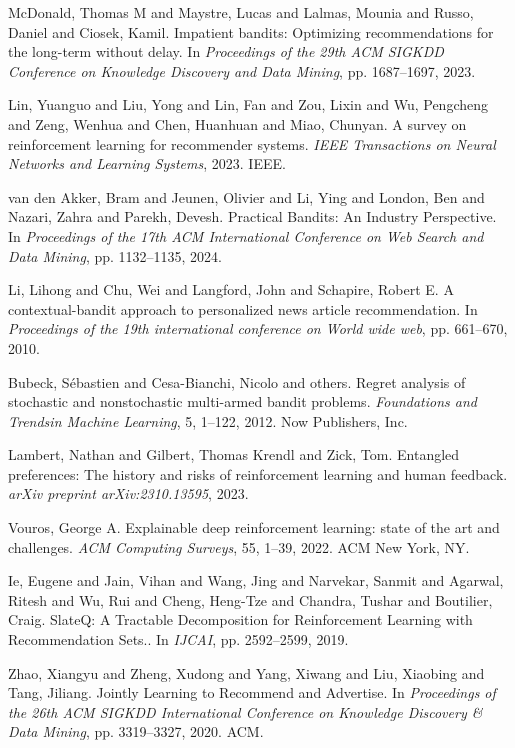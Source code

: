 \begin{thebibliography}{99}
 McDonald, Thomas M and Maystre, Lucas and Lalmas, Mounia and Russo, Daniel and Ciosek, Kamil. {I}mpatient bandits: {O}ptimizing recommendations for the long-term without delay. In \textit{Proceedings of the 29th ACM SIGKDD Conference on Knowledge Discovery and Data Mining}, pp. 1687--1697, 2023.

 Lin, Yuanguo and Liu, Yong and Lin, Fan and Zou, Lixin and Wu, Pengcheng and Zeng, Wenhua and Chen, Huanhuan and Miao, Chunyan. {A} survey on reinforcement learning for recommender systems. \textit{IEEE Transactions on Neural Networks and Learning Systems}, 2023. IEEE.

 van den Akker, Bram and Jeunen, Olivier and Li, Ying and London, Ben and Nazari, Zahra and Parekh, Devesh. {P}ractical {B}andits: {A}n {I}ndustry {P}erspective. In \textit{Proceedings of the 17th ACM International Conference on Web Search and Data Mining}, pp. 1132--1135, 2024.

 Li, Lihong and Chu, Wei and Langford, John and Schapire, Robert E. {A} contextual-bandit approach to personalized news article recommendation. In \textit{Proceedings of the 19th international conference on World wide web}, pp. 661--670, 2010.

 Bubeck, S{\'e}bastien and Cesa-Bianchi, Nicolo and others. {R}egret analysis of stochastic and nonstochastic multi-armed bandit problems. \textit{Foundations and Trends\textregistered  in Machine Learning}, 5, 1--122, 2012. Now Publishers, Inc.

 Lambert, Nathan and Gilbert, Thomas Krendl and Zick, Tom. {E}ntangled preferences: {T}he history and risks of reinforcement learning and human feedback. \textit{arXiv preprint arXiv:2310.13595}, 2023.

 Vouros, George A. {E}xplainable deep reinforcement learning: state of the art and challenges. \textit{ACM Computing Surveys}, 55, 1--39, 2022. ACM New York, NY.

 Ie, Eugene and Jain, Vihan and Wang, Jing and Narvekar, Sanmit and Agarwal, Ritesh and Wu, Rui and Cheng, Heng-Tze and Chandra, Tushar and Boutilier, Craig. {S}late{Q}: {A} Tractable {D}ecomposition for {R}einforcement {L}earning with {R}ecommendation {S}ets.. In \textit{IJCAI}, pp. 2592--2599, 2019.

 Zhao, Xiangyu and Zheng, Xudong and Yang, Xiwang and Liu, Xiaobing and Tang, Jiliang. {J}ointly {L}earning to {R}ecommend and {A}dvertise. In \textit{Proceedings of the 26th ACM SIGKDD International Conference on Knowledge Discovery \& Data Mining}, pp. 3319--3327, 2020. ACM.


\end{thebibliography}
